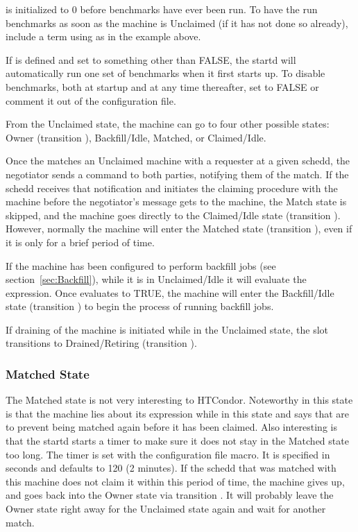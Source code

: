 \Note {} is initialized to 0 before benchmarks
have ever been run.
To have the  run benchmarks as soon as the machine is
Unclaimed (if it has not done so already),
include a term using  as in the example above.

\Note If  is defined and set to something
other than FALSE, the startd will automatically run one set of
benchmarks when it first starts up.
To disable benchmarks, both at startup and at any time thereafter,
set  to FALSE or comment it out of the
configuration file.

From the Unclaimed state, the machine can go to four other possible
states: Owner (transition ), Backfill/Idle, Matched, or
Claimed/Idle.

Once the  matches an Unclaimed machine with a
requester at a given schedd, the negotiator sends a command to both
parties, notifying them of the match.  
If the schedd receives that notification and initiates the claiming
procedure with the machine before the negotiator's message gets to the
machine, the Match state is skipped,
and the machine goes
directly to the Claimed/Idle state (transition ).
However, normally the machine will enter the Matched state (transition
), even if it is only for a brief period of time.

If the machine has been configured to perform backfill jobs (see
section~\ref{sec:Backfill}), while it is in Unclaimed/Idle it will
evaluate the  expression.
Once  evaluates to TRUE, the machine will enter
the Backfill/Idle state (transition ) to begin the process of
running backfill jobs.

If draining of the machine is initiated while in the Unclaimed state,
the slot transitions to Drained/Retiring (transition ).

\subsubsection{\label{sec:Matched-State}Matched State}

The Matched state is not very interesting to HTCondor.
Noteworthy in this state is that the machine lies about its 
expression while in this state and says that  are
 to prevent being matched again before it has been claimed.
Also interesting is that
the startd starts a timer to make sure it does not stay in the
Matched state too long.
The timer is set with the 
\label{param:MatchTimeout} configuration file macro.
It is specified in seconds and defaults to 120 (2 minutes).
If the schedd that was matched with this machine does not
claim it within this period of time, the machine gives up,
and goes back into the Owner state via transition .
It will probably leave the Owner state right away for the
Unclaimed state again and wait for another match. 

